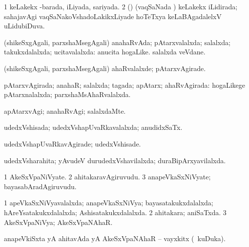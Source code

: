 \bentry
{} 
\gl{\gu}
\expl{}
\bmng
\bnum
\num{1} keLakekx -barada, iLiyada, sariyada. 
\num{2} (\veYshA) (vaqSaNada \vi) keLakekx iLidirada; sahajavAgi vaqSaNakoVshadoLakikxLiyade hoTeTxya keLaBAgadalelxV uLidubiDuva. 
\enum
\emng
\eentry

\bentry
{} 
\gl{\gu}
\expl{}
\bmng
 (shikeSxgAgali, parxshaMsegAgali) anahaRvAda; pAtarxvalalxda; salalxda; takukxdalalxda; ucitavalalxda:  anucita hogaLike.  salalxda veVdane. 
\emng
\eentry

\bentry
{} 
\gl{\kirxvi}
\expl{}
\bmng
 (shikeSxgAgali, parxshaMsegAgali) ahaRvalalxde; pAtarxvAgirade. 
\emng
\eentry

\bentry
{} 
\gl{\gu}
\expl{}
\bmng
 pAtarxvAgirada; anahaR; salalxda; tagada; apAtarx; ahaRvAgirada:  hogaLikege pAtarxnalalxda; parxshaMsAhaRvalalxda. 
\emng
\eentry

\bentry
{} 
\gl{\kirxvi}
\expl{}
\bmng
 apAtarxvAgi; anahaRvAgi; salalxdaMte. 
\emng
\eentry

\bentry
{} 
\gl{\gu}
\expl{}
\bmng
 udedxVshisada; udedxVshapUvaRkavalalxda; anudidxSaTx. 
\emng
\eentry

\bentry
{} 
\gl{\kirxvi}
\expl{}
\bmng
udedxVshapUvaRkavAgirade; udedxVshisade. 
\emng
\eentry

\bentry
{} 
\gl{\gu}
\expl{}
\bmng
 udedxVsharahita; yAvudeV durudedxVshavilalxda; duraBipArxyavilalxda. 
\emng
\eentry

\bentry
{} 
\gl{\nA}
\expl{}
\bmng
\bnum
\num{1} AkeSxVpaNiVyate. 
\num{2} ahitakaravAgiruvudu. 
\num{3} anapeVkaSxNiVyate; bayasabAradAgiruvudu. 
\enum
\emng
\eentry

\bentry
{} 
\gl{\gu}
\expl{}
\bmng
\bnum
\num{1} apeVkaSxNiVyavalalxda; anapeVkaSxNiVya; bayasatakukxdalalxda; hAreYsatakukxdalalxda; Ashisatakukxdalalxda. 
\num{2} ahitakara; aniSaTxda. 
\num{3} AkeSxVpaNiVya; AkeSxVpaNAhaR. 
\enum
\emng
\eentry

\bentry
{} 
\gl{\nA}
\expl{}
\bmng
 anapeVkiSxta yA ahitavAda yA AkeSxVpaNAhaR -- vayxkitx (\kanmu\ kuDuka). 
\emng
\eentry

